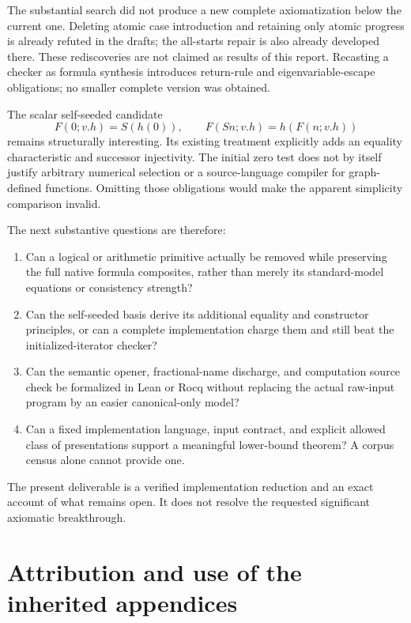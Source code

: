 \documentclass[11pt,letterpaper]{article}
\theoremstyle{definition}\newtheorem{definition}[theorem]{Definition}
\theoremstyle{remark}\newtheorem{remark}[theorem]{Remark}
\begin{document}
The substantial search did not produce a new complete axiomatization below
the current one. Deleting atomic case introduction and retaining only atomic
progress is already refuted in the drafts; the all-starts repair is also
already developed there. These rediscoveries are not claimed as results of
this report. Recasting a checker as formula synthesis introduces return-rule
and eigenvariable-escape obligations; no smaller complete version was obtained.

The scalar self-seeded candidate
\[
 F(0;v.h)=S(h(0)),\qquad F(Sn;v.h)=h(F(n;v.h))
\]
remains structurally interesting. Its existing treatment explicitly adds an
equality characteristic and successor injectivity. The initial zero test
does not by itself justify arbitrary numerical selection or a source-language
compiler for graph-defined functions. Omitting those obligations would make
the apparent simplicity comparison invalid.

The next substantive questions are therefore:
\begin{enumerate}
\item Can a logical or arithmetic primitive actually be removed while
      preserving the full native formula composites, rather than merely its
      standard-model equations or consistency strength?
\item Can the self-seeded basis derive its additional equality and constructor
      principles, or can a complete implementation charge them and still beat
      the initialized-iterator checker?
\item Can the semantic opener, fractional-name discharge, and computation
      source check be formalized in Lean or Rocq without replacing the actual
      raw-input program by an easier canonical-only model?
\item Can a fixed implementation language, input contract, and explicit allowed
      class of presentations support a meaningful lower-bound theorem? A
      corpus census alone cannot provide one.
\end{enumerate}

The present deliverable is a verified implementation reduction and an exact
account of what remains open. It does not resolve the requested significant
axiomatic breakthrough.

\clearpage
\appendix
\section*{Attribution and use of the inherited appendices}
\end{document}
